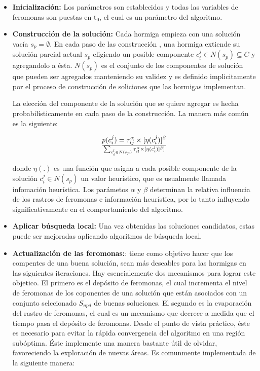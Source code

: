 \begin{itemize}

\item {\bf Inicializaci\'on:} Los par\'ametros son establecidos y todas las variables 
de feromonas son puestas en t$_{0}$, el cual es un par\'ametro del algoritmo.

\item {\bf Construcci\'on de la soluci\'on:} Cada hormiga empieza con una soluci\'on vac\'ia
$s_p = \emptyset $. En cada paso de las construcci\'on , una hormiga
extiende su soluci\'on parcial actual $s_p$ eligiendo un posible componente $c_i^j \in N(s_p) \subseteq C$ 
y agregandolo a \'esta. $N(s_p)$ es el conjunto de los
componentes de soluci\'on que pueden ser agregados manteniendo su validez
y es definido implicitamente por el proceso de construcci\'on de soliciones
que las hormigas implementan. 

La elecci\'on del componente de la soluci\'on que se quiere agregar es 
hecha probabil\'isticamente en cada paso de la construcci\'on. La manera m\'as
com\'un es la siguiente:

\[
p(c_i^j) = {\tau_{ij}^{\alpha}  \times [ \eta (c_i^j) ]^{\beta}}  \over { \sum_{c_i^l \in N(s_p)} \tau_{il}^{\alpha} \times [\eta (c_i^l)]^{\beta}] } 
\]

donde $\eta(.)$ es una funci\'on  que asigna a cada posible componente 
de la soluci\'on $c_i^j \in N(s_p)$ un valor heur\'istico, que es usualmente
llamada infomaci\'on heur\'istica. Los par\'ametos $\alpha$ y $\beta$ 
determinan la relativa influencia de los rastros de feromonas e informaci\'on
heur\'istica, por lo tanto influyendo significativamente en el comportamiento
del algoritmo.


\item {\bf Aplicar b\'usqueda local:} Una vez obtenidas las soluciones candidatos,
estas puede ser mejoradas aplicando algoritmos de b\'usqueda local.

\item {\bf Actualizaci\'on de las feromonas:}: tiene como objetivo
hacer que los compentes de una buena soluci\'on, 
sean m\'as deseables para las hormigas en las siguientes iteraciones. Hay esencialemente
dos mecanismos para lograr este objetico. El primero es el dep\'osito de feromonas,
el cual incrementa el nivel de feromonas de los coponentes de una soluci\'on
que est\'an asociados con un conjunto selccionado $S_{upd}$ de buenas soluciones.
El segundo es la evaporaci\'on del rastro de feromonas, el cual es un mecanismo
que decrece a medida que el tiempo pasa el dep\'osito de feromonas. Desde el punto de
vista pr\'actico, \'este es necesario para evitar la r\'apida convergencia del algoritmo
en una regi\'on sub\'optima. \'Este implemente una manera bastante \'util de olvidar,
favoreciendo la exploraci\'on de nuevas \'areas. Es comunmente implementada de la siguiente
manera:


\end{itemize}
